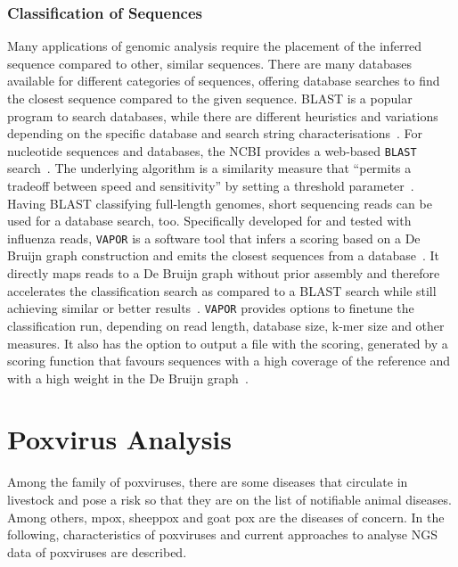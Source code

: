 \subsubsection*{Classification of Sequences}
Many applications of genomic analysis require the placement of the inferred sequence compared to other, similar sequences. There are many databases available for different categories of sequences, offering database searches to find the closest sequence compared to the given sequence. \ac{BLAST} is a popular program to search databases, while there are different heuristics and variations depending on the specific database and search string characterisations~\cite{altschul1990basic}. For nucleotide sequences and databases, the \ac{NCBI} provides a web-based \texttt{\ac{BLAST}} search~\cite{johnson2008ncbi, altschul1997gapped}. The underlying algorithm is a similarity measure that ``permits a tradeoff between speed and sensitivity'' by setting a threshold parameter~\cite{altschul1997gapped}. \\
Having BLAST classifying full-length genomes, short sequencing reads can be used for a database search, too. Specifically developed for and tested with influenza reads, \texttt{VAPOR} is a software tool that infers a scoring based on a De Bruijn graph construction and emits the closest sequences from a database~\cite{southgate2020influenza}. It directly maps reads to a De Bruijn graph without prior assembly and therefore accelerates the classification search as compared to a BLAST search while still achieving similar or better results~\cite{southgate2020influenza}. \texttt{VAPOR} provides options to finetune the classification run, depending on read length, database size, k-mer size and other measures. It also has the option to output a file with the scoring, generated by a scoring function that favours sequences with a high coverage of the reference and with a high weight in the De Bruijn graph~\cite{southgate2020influenza}.

\section{Poxvirus Analysis}\label{sec:2-pox}
Among the family of poxviruses, there are some diseases that circulate in livestock and pose a risk so that they are on the list of notifiable animal diseases. Among others, mpox, sheeppox and goat pox are the diseases of concern. In the following, characteristics of poxviruses and current approaches to analyse \ac{NGS} data of poxviruses are described.

